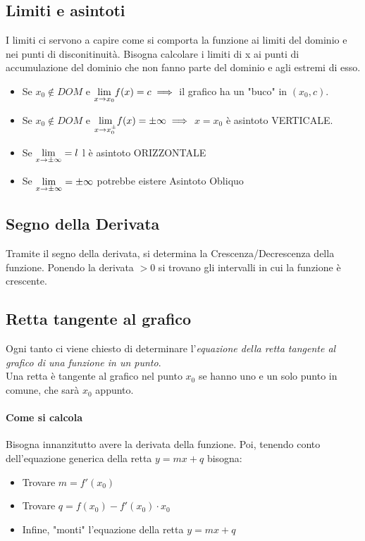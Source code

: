 \documentclass[12pt, a4paper, openany]{book}
\begin{document}
\subsection*{Limiti e asintoti}
I limiti ci servono a capire come si comporta la funzione ai limiti del dominio e nei punti di disconitinuità.
Bisogna calcolare i limiti di x ai punti di accumulazione del dominio che non fanno parte del dominio e agli estremi di esso.

\begin{itemize}
	\item Se $x_0 \notin DOM$ e $\underset{x \to x_0}{\lim} f(x) = c \implies$ il grafico ha un "buco" in $(x_0,c)$.
 \item Se $x_0 \notin DOM$ e $\underset{x \to x_{0}^\pm}{\lim} f(x) = \pm \infty \implies$ $x=x_0$ è asintoto VERTICALE.
 \item Se $\underset{x \to \pm \infty}{\lim} = l$ l è asintoto ORIZZONTALE
 \item Se $\underset{x \to \pm \infty}{\lim} = \pm \infty$ potrebbe eistere Asintoto Obliquo
\end{itemize}
\subsection*{Segno della Derivata}
Tramite il segno della derivata, si determina la Crescenza/Decrescenza della funzione.
Ponendo la derivata $>0$ si trovano gli intervalli in cui la funzione è crescente.

\subsection*{Retta tangente al grafico}
Ogni tanto ci viene chiesto di determinare l'\emph{equazione della retta tangente al grafico di una funzione in un punto}.
\\Una retta è tangente al grafico nel punto $x_0$ se hanno uno e un solo punto in comune, che sarà $x_0$ appunto.

\paragraph{Come si calcola}
Bisogna innanzitutto avere la derivata della funzione. Poi, tenendo conto dell'equazione generica della retta $y=mx+q$ bisogna:
\begin{itemize}
	\item Trovare $m= f'(x_0)$
 \item Trovare $q = f(x_0)-f'(x_0) \cdot x_0$
 \item Infine, "monti" l'equazione della retta $y=mx+q$
\end{itemize}
\end{document}
